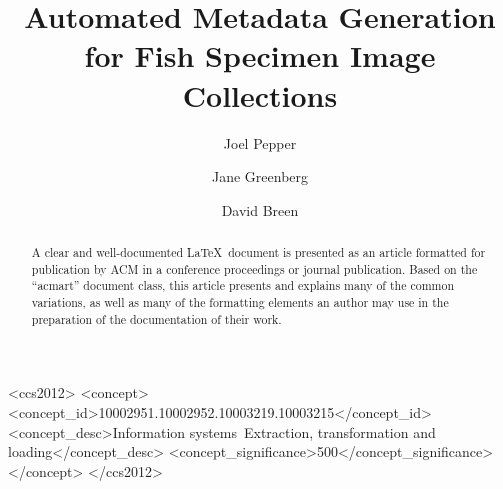 \documentclass[screen,review]{acmart}
\begin{document}
\title{Automated Metadata Generation for Fish Specimen Image Collections}

\author{Joel Pepper}
\author{Jane Greenberg}
\author{David Breen}

\renewcommand{\shortauthors}{Pepper, Greenberg and Breen}

\begin{abstract}
  A clear and well-documented \LaTeX\ document is presented as an
  article formatted for publication by ACM in a conference proceedings
  or journal publication. Based on the ``acmart'' document class, this
  article presents and explains many of the common variations, as well
  as many of the formatting elements an author may use in the
  preparation of the documentation of their work.
\end{abstract}

\begin{CCSXML}
<ccs2012>
   <concept>
       <concept_id>10002951.10002952.10003219.10003215</concept_id>
       <concept_desc>Information systems~Extraction, transformation and loading</concept_desc>
       <concept_significance>500</concept_significance>
       </concept>
 </ccs2012>
\end{CCSXML}


\end{document}
